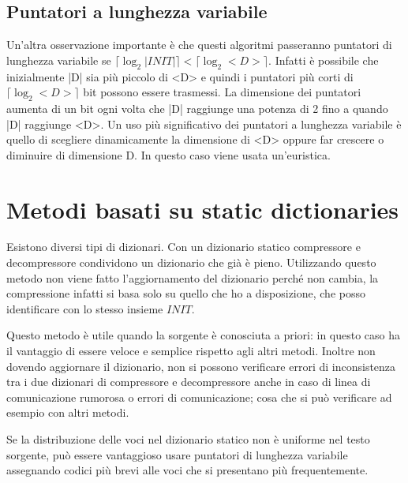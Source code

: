 \subsection{Puntatori a lunghezza variabile}
Un'altra osservazione importante è che questi algoritmi passeranno puntatori di lunghezza variabile se \(\lceil \log_2 |INIT| \rceil < \lceil \log_2 <D> \rceil\). Infatti è possibile che inizialmente |D| sia più piccolo di <D> e quindi i puntatori più corti di \(\lceil \log_2 <D> \rceil\) bit possono essere trasmessi. La dimensione dei puntatori aumenta di un bit ogni volta che |D| raggiunge una potenza di 2 fino a quando |D| raggiunge <D>. Un uso più significativo dei puntatori a lunghezza variabile è quello di scegliere dinamicamente la dimensione di <D> oppure far crescere o diminuire di dimensione D. In questo caso viene usata un'euristica.

\section{Metodi basati su static dictionaries}
Esistono diversi tipi di dizionari. Con un dizionario statico compressore e decompressore condividono un dizionario che già è pieno. Utilizzando questo metodo non viene fatto l'aggiornamento del dizionario perché non cambia, la compressione infatti si basa solo su quello che ho a disposizione, che posso identificare con lo stesso insieme \(INIT\). 

Questo metodo è utile quando la sorgente è conosciuta a priori: in questo caso ha il vantaggio di essere veloce e semplice rispetto agli altri metodi. Inoltre non dovendo aggiornare il dizionario, non si possono verificare errori di inconsistenza tra i due dizionari di compressore e decompressore anche in caso di linea di comunicazione rumorosa o errori di comunicazione; cosa che si può verificare ad esempio con altri metodi.

Se la distribuzione delle voci nel dizionario statico non è uniforme nel testo sorgente, può essere vantaggioso usare puntatori di lunghezza variabile assegnando codici più brevi alle voci che si presentano più frequentemente.

